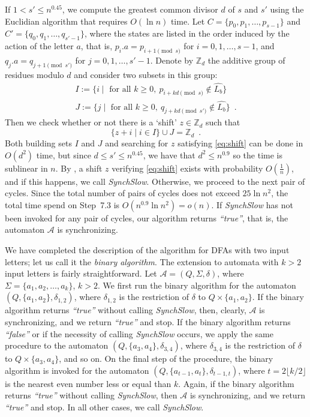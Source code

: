\documentclass{llncs}
\begin{document}
If $1<s'\le n^{0.45}$, we compute the greatest common divisor $d$ of $s$ and $s'$ using the Euclidian algorithm that requires $O(\ln n)$ time. Let $C=\{p_0,p_1,\dots,p_{s-1}\}$ and $C'=\{q_0,q_1,\dots,q_{s'-1}\}$, where the states are listed in the order induced by the action of the letter $a$, that is, $p_i.a=p_{i+1\!\pmod{s}}$ for $i=0,1,\dots,s-1$, and $q_j.a=q_{j+1\!\pmod{s'}}$ for $j=0,1,\dots,s'-1$. Denote by $\mathbb{Z}_d$ the additive group of residues modulo $d$ and consider two subsets in this group:
\begin{gather*}
I:=\{i\mid\text{ for all } k\ge0,\ p_{i+kd\!\!\!\pmod{s}}\notin\widehat{L_b}\}\\
J:=\{j\mid\text{ for all } k\ge0,\ q_{j+kd\!\!\!\pmod{s'}}\notin\widehat{L_b}\}\enspace.
\end{gather*}
Then we check whether or not there is a `shift' $z\in\mathbb{Z}_d$ such that
\begin{equation}
\label{eq:shift}
\{z + i\mid i \in I\} \cup J = \mathbb{Z}_d\enspace.
\end{equation}
Both building sets $I$ and $J$ and searching for $z$ satisfying \eqref{eq:shift} can be done in $O(d^2)$ time, but since $d\le s'\le n^{0.45}$, we have that $d^2\le n^{0.9}$ so the time is sublinear in $n$. By \cite[Theorem~2, Case~2]{Berlinkov:preprint}, a shift $z$ verifying \eqref{eq:shift} exists with probability $O(\frac1n)$, and if this happens, we call \emph{SynchSlow}. Otherwise, we proceed to the next pair of cycles. Since the total number of pairs of cycles does not exceed $25 \ln{n}^2$, the total time spend on Step~7.3 is $O(n^{0.9} \ln{n}^2)=o(n)$. If \emph{SynchSlow} has not been invoked for any pair of cycles, our algorithm returns \emph{``true''}, that is, the automaton $\mathcal{A}$ is synchronizing. 

\smallskip

We have completed the description of the algorithm for DFAs with two input letters; let us call it the \emph{binary algorithm}. The extension to automata with $k>2$ input letters is fairly straightforward. Let $\mathcal{A}=(Q,\Sigma,\delta)$, where $\Sigma=\{a_1,a_2,\dots,a_k\}$, $k>2$. We first run the binary algorithm for the automaton $(Q,\{a_1,a_2\},\delta_{1,2})$, where $\delta_{1,2}$ is the restriction of $\delta$ to $Q\times\{a_1,a_2\}$. If the binary algorithm returns \emph{``true''} without calling \emph{SynchSlow}, then, clearly, $\mathcal{A}$ is synchronizing, and we return \emph{``true''} and stop. If the binary algorithm returns \emph{``false''} or if the necessity of calling \emph{SynchSlow} occurs, we apply the same procedure to the automaton $(Q,\{a_3,a_4\},\delta_{3,4})$, where $\delta_{3,4}$ is the restriction of $\delta$ to $Q\times\{a_3,a_4\}$, and so on. On the final step of the procedure, the binary algorithm is invoked for the automaton $(Q,\{a_{t-1},a_t\},\delta_{t-1, t})$, where $t=2\lfloor k/2\rfloor$ is the nearest even number less or equal than $k$. Again, if the binary algorithm returns \emph{``true''} without calling \emph{SynchSlow}, then $\mathcal{A}$ is synchronizing, and we return \emph{``true''} and stop. In all other cases, we call \emph{SynchSlow}. 
\end{document}
